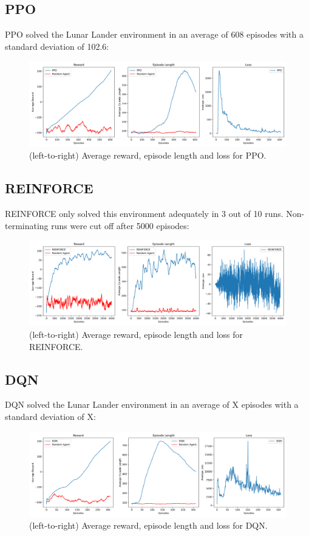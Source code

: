 \documentclass{article}
\begin{document}
\subsection{PPO}
PPO solved the Lunar Lander environment in an average of 608 episodes with a standard deviation of 102.6:
\begin{figure}[H]
  \centering
  \includegraphics[scale=0.35]{1.png}
  \caption{(left-to-right) Average reward, episode length and loss for PPO.}
\end{figure}
\subsection{REINFORCE}
REINFORCE only solved this environment adequately in 3 out of 10 runs. Non-terminating runs were cut off after 5000 episodes:
\begin{figure}[H]
  \centering
  \includegraphics[scale=0.35]{2.png}
  \caption{(left-to-right) Average reward, episode length and loss for REINFORCE.}
\end{figure}
\subsection{DQN}
DQN solved the Lunar Lander environment in an average of X episodes with a standard deviation of X:
\begin{figure}[H]
  \centering
  \includegraphics[scale=0.35]{3.png}
  \caption{(left-to-right) Average reward, episode length and loss for DQN.}
\end{figure}
\end{document}
